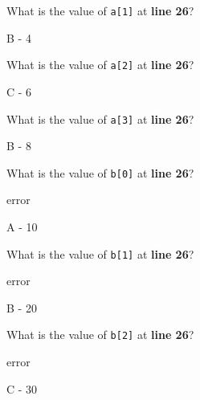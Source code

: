 \documentclass[11pt,answers]{exam}
\begin{document}
\begin{questions}
\question[1] What is the value of {\tt a[1]} at {\bf line 26}? \newline
\begin{oneparchoices}
	   
\end{oneparchoices}
\begin{solution} B - 4 \end{solution}

\question[1] What is the value of {\tt a[2]} at {\bf line 26}? \newline
\begin{oneparchoices}
	   
\end{oneparchoices}
\begin{solution} C - 6 \end{solution}

\question[1] What is the value of {\tt a[3]} at {\bf line 26}? \newline
\begin{oneparchoices}
	   
\end{oneparchoices}
\begin{solution} B - 8 \end{solution}

\newpage

\question[1] What is the value of {\tt b[0]} at {\bf line 26}? \newline
\begin{oneparchoices}
	    \choice error
\end{oneparchoices}
\begin{solution} A - 10 \end{solution}

\question[1] What is the value of {\tt b[1]} at {\bf line 26}? \newline
\begin{oneparchoices}
	    \choice error
\end{oneparchoices}
\begin{solution} B - 20 \end{solution}

\question[1] What is the value of {\tt b[2]} at {\bf line 26}? \newline
\begin{oneparchoices}
	    \choice error
\end{oneparchoices}
\begin{solution} C - 30 \end{solution}


\end{questions}
\end{document}
